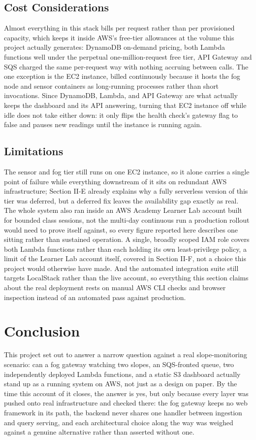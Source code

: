 \documentclass[conference]{IEEEtran}
\begin{document}
\subsection{Cost Considerations}
Almost everything in this stack bills per request rather than per provisioned capacity, which keeps it inside AWS's free-tier allowances at the volume this project actually generates: DynamoDB on-demand pricing, both Lambda functions well under the perpetual one-million-request free tier, API Gateway and SQS charged the same per-request way with nothing accruing between calls. The one exception is the EC2 instance, billed continuously because it hosts the fog node and sensor containers as long-running processes rather than short invocations. Since DynamoDB, Lambda, and API Gateway are what actually keeps the dashboard and its API answering, turning that EC2 instance off while idle does not take either down: it only flips the health check's gateway flag to false and pauses new readings until the instance is running again.

\subsection{Limitations}
The sensor and fog tier still runs on one EC2 instance, so it alone carries a single point of failure while everything downstream of it sits on redundant AWS infrastructure; Section II-E already explains why a fully serverless version of this tier was deferred, but a deferred fix leaves the availability gap exactly as real. The whole system also ran inside an AWS Academy Learner Lab account built for bounded class sessions, not the multi-day continuous run a production rollout would need to prove itself against, so every figure reported here describes one sitting rather than sustained operation. A single, broadly scoped IAM role covers both Lambda functions rather than each holding its own least-privilege policy, a limit of the Learner Lab account itself, covered in Section II-F, not a choice this project would otherwise have made. And the automated integration suite still targets LocalStack rather than the live account, so everything this section claims about the real deployment rests on manual AWS CLI checks and browser inspection instead of an automated pass against production.

\section{Conclusion}
This project set out to answer a narrow question against a real slope-monitoring scenario: can a fog gateway watching two slopes, an SQS-fronted queue, two independently deployed Lambda functions, and a static S3 dashboard actually stand up as a running system on AWS, not just as a design on paper. By the time this account of it closes, the answer is yes, but only because every layer was pushed onto real infrastructure and checked there: the fog gateway keeps no web framework in its path, the backend never shares one handler between ingestion and query serving, and each architectural choice along the way was weighed against a genuine alternative rather than asserted without one.
\end{document}
